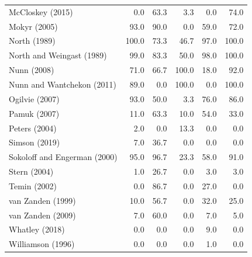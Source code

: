 \begin{table}[ht]
\begin{tabular}{lrrrrr}
McCloskey (2015) & 0.0 & 63.3 & 3.3 & 0.0 & 74.0 \\
Mokyr (2005) & 93.0 & 90.0 & 0.0 & 59.0 & 72.0 \\
North (1989) & 100.0 & 73.3 & 46.7 & 97.0 & 100.0 \\
North and Weingast (1989) & 99.0 & 83.3 & 50.0 & 98.0 & 100.0 \\
Nunn (2008) & 71.0 & 66.7 & 100.0 & 18.0 & 92.0 \\
Nunn and Wantchekon (2011) & 89.0 & 0.0 & 100.0 & 0.0 & 100.0 \\
Ogilvie (2007) & 93.0 & 50.0 & 3.3 & 76.0 & 86.0 \\
Pamuk (2007) & 11.0 & 63.3 & 10.0 & 54.0 & 33.0 \\
Peters (2004) & 2.0 & 0.0 & 13.3 & 0.0 & 0.0 \\
Simson (2019) & 7.0 & 36.7 & 0.0 & 0.0 & 0.0 \\
Sokoloff and Engerman (2000) & 95.0 & 96.7 & 23.3 & 58.0 & 91.0 \\
Stern (2004) & 1.0 & 26.7 & 0.0 & 3.0 & 3.0 \\
Temin (2002) & 0.0 & 86.7 & 0.0 & 27.0 & 0.0 \\
van Zanden (1999) & 10.0 & 56.7 & 0.0 & 32.0 & 25.0 \\
van Zanden (2009) & 7.0 & 60.0 & 0.0 & 7.0 & 5.0 \\
Whatley (2018) & 0.0 & 0.0 & 0.0 & 9.0 & 0.0 \\
Williamson (1996) & 0.0 & 0.0 & 0.0 & 1.0 & 0.0 \\
\bottomrule
\end{tabular}
\end{table}
